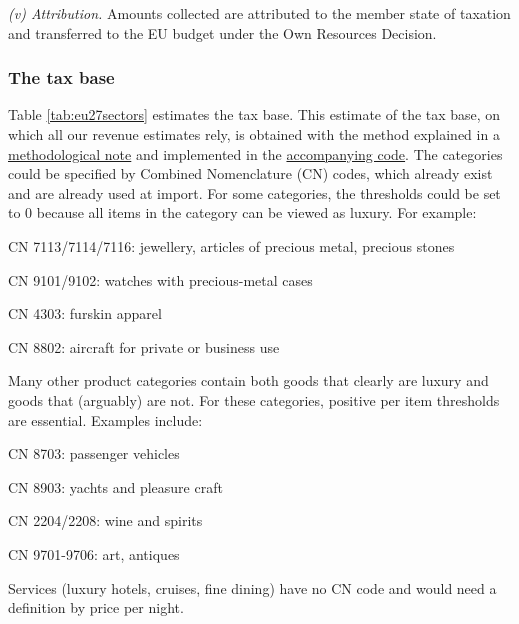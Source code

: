 \documentclass[../../main]{subfiles}
\begin{document}
\emph{(v) Attribution.} Amounts collected are attributed to the member state of taxation and transferred to the EU budget under the Own Resources Decision.

\subsubsection{The tax base}\label{sec:thresholds} %

Table \ref{tab:eu27sectors} estimates the tax base.
This estimate of the tax base, on which all our revenue estimates rely, is obtained with the method explained in a \href{https://drive.google.com/file/d/1jQpiYjQQhRa-qtqjDWuFDOuUFEdWm0uP/view?usp=drive_link}{methodological note} and implemented in the \href{https://drive.google.com/file/d/1vY1f4qPcNUV3O-cULSOcm6sypcVHI8Lu/view?usp=sharing}{accompanying code}.
The categories could be specified by Combined Nomenclature (CN) codes, which already exist and are already used at import. For some categories, the thresholds could be set to 0 because all items in the category can be viewed as luxury. For example:

CN 7113/7114/7116: jewellery, articles of precious metal, precious stones

CN 9101/9102: watches with precious-metal cases

CN 4303: furskin apparel

CN 8802: aircraft for private or business use

Many other product categories contain both goods that clearly are luxury and goods that (arguably) are not. For these categories, positive per item thresholds are essential. Examples include:

CN 8703: passenger vehicles

CN 8903: yachts and pleasure craft

CN 2204/2208: wine and spirits

CN 9701-9706: art, antiques

Services (luxury hotels, cruises, fine dining) have no CN code and would need a definition by price per night.
\end{document}
